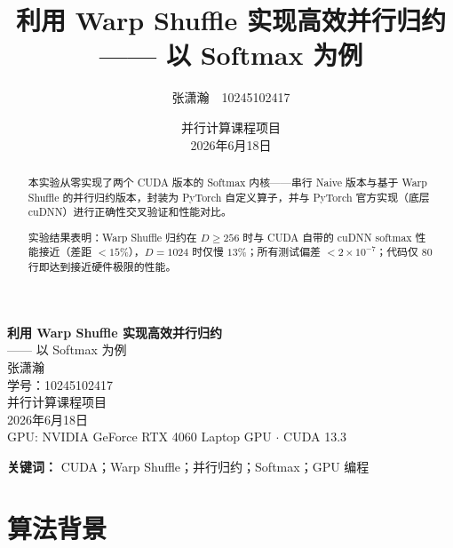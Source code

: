 \documentclass[12pt,a4paper]{ctexart}
\title{\textbf{利用 Warp Shuffle 实现高效并行归约} \\[8pt] \large —— 以 Softmax 为例}
\author{张潇瀚\ \ 10245102417}
\date{并行计算课程项目 \\[4pt] 2026年6月18日}
\begin{document}
\begin{titlepage}
\thispagestyle{empty}
\begin{center}
\vspace*{4cm}

{\LARGE\textbf{利用 Warp Shuffle 实现高效并行归约}}\\[12pt]
{\Large —— 以 Softmax 为例}\\[3cm]

{\Large 张潇瀚}\\[6pt]
{\large 学号：10245102417}\\[2cm]

{\large 并行计算课程项目}\\[8pt]
{\large 2026年6月18日}\\[6cm]

\vfill
{\small GPU: NVIDIA GeForce RTX 4060 Laptop GPU $\cdot$ CUDA 13.3}
\end{center}
\end{titlepage}

\newpage
\setcounter{page}{1}

\begin{abstract}
\noindent
本实验从零实现了两个 CUDA 版本的 Softmax 内核——串行 Naive 版本与基于 Warp Shuffle 的并行归约版本，封装为 PyTorch 自定义算子，并与 PyTorch 官方实现（底层 cuDNN）进行正确性交叉验证和性能对比。

实验结果表明：Warp Shuffle 归约在 $D \geq 256$ 时与 CUDA 自带的 cuDNN softmax 性能接近（差距 $<15\%$），$D=1024$ 时仅慢 $13\%$；所有测试偏差 $<2\times10^{-7}$；代码仅 80 行即达到接近硬件极限的性能。
\end{abstract}

\vspace{8pt}
\noindent\textbf{关键词：} CUDA；Warp Shuffle；并行归约；Softmax；GPU 编程

\newpage
\setcounter{page}{1}
\tableofcontents
\newpage

\section{算法背景}
\end{document}
